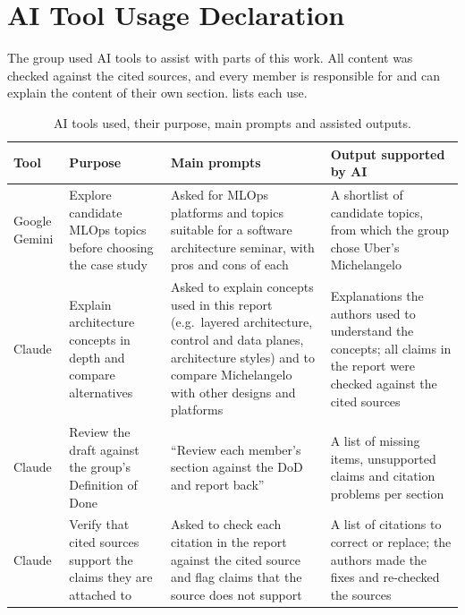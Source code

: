 
\section{AI Tool Usage Declaration}
\label{sec:ai-declaration}

The group used AI tools to assist with parts of this work. All content was
checked against the cited sources, and every member is responsible for and can
explain the content of their own section.  lists each
use.

\begin{table}[ht]
  \centering
  \small
  \caption{AI tools used, their purpose, main prompts and assisted outputs.}
  \label{tab:ai-declaration}
  \begin{tabularx}{\linewidth}{@{}L{2.2cm}*{3}{>{\raggedright\arraybackslash}X}@{}}
    \toprule
    \textbf{Tool} & \textbf{Purpose} & \textbf{Main prompts} & \textbf{Output supported by AI} \\
    \midrule
    Google Gemini
      & Explore candidate MLOps topics before choosing the case study
      & Asked for MLOps platforms and topics suitable for a software
        architecture seminar, with pros and cons of each
      & A shortlist of candidate topics, from which the group chose Uber's
        Michelangelo \\
    \addlinespace
    Claude
      & Explain architecture concepts in depth and compare alternatives
      & Asked to explain concepts used in this report (e.g.\ layered
        architecture, control and data planes, architecture styles) and to
        compare Michelangelo with other designs and platforms
      & Explanations the authors used to understand the concepts; all claims in
        the report were checked against the cited sources \\
    \addlinespace
    Claude
      & Review the draft against the group's Definition of Done
      & ``Review each member's section against the DoD and report back''
      & A list of missing items, unsupported claims and citation problems per section \\
    \addlinespace
    Claude
      & Verify that cited sources support the claims they are attached to
      & Asked to check each citation in the report against the cited source
        and flag claims that the source does not support
      & A list of citations to correct or replace; the authors made the fixes
        and re-checked the sources \\
    \bottomrule
  \end{tabularx}
\end{table}
